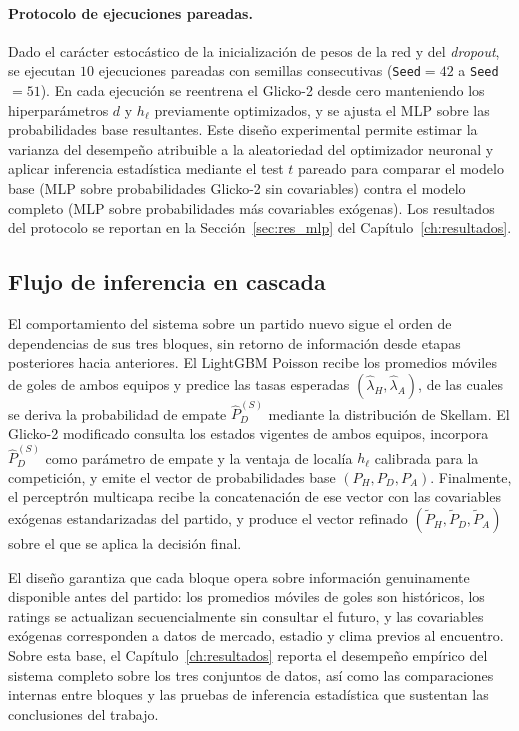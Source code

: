 \paragraph{Protocolo de ejecuciones pareadas.} Dado el car\'acter estoc\'astico de la inicializaci\'on de pesos de la red y del \emph{dropout}, se ejecutan $10$ ejecuciones pareadas con semillas consecutivas (\texttt{Seed}$=42$ a \texttt{Seed}$=51$). En cada ejecuci\'on se reentrena el Glicko-2 desde cero manteniendo los hiperpar\'ametros $d$ y $h_\ell$ previamente optimizados, y se ajusta el MLP sobre las probabilidades base resultantes. Este dise\~no experimental permite estimar la varianza del desempe\~no atribuible a la aleatoriedad del optimizador neuronal y aplicar inferencia estad\'istica mediante el test $t$ pareado para comparar el modelo base (MLP sobre probabilidades Glicko-2 sin covariables) contra el modelo completo (MLP sobre probabilidades m\'as covariables ex\'ogenas). Los resultados del protocolo se reportan en la Secci\'on~\ref{sec:res_mlp} del Cap\'itulo~\ref{ch:resultados}.

\subsection{Flujo de inferencia en cascada}
\label{subsec:cascada}

El comportamiento del sistema sobre un partido nuevo sigue el orden de dependencias de sus tres bloques, sin retorno de informaci\'on desde etapas posteriores hacia anteriores. El LightGBM Poisson recibe los promedios m\'oviles de goles de ambos equipos y predice las tasas esperadas $(\hat{\lambda}_H, \hat{\lambda}_A)$, de las cuales se deriva la probabilidad de empate $\hat{P}_D^{(S)}$ mediante la distribuci\'on de Skellam. El Glicko-2 modificado consulta los estados vigentes de ambos equipos, incorpora $\hat{P}_D^{(S)}$ como par\'ametro de empate y la ventaja de local\'ia $h_\ell$ calibrada para la competici\'on, y emite el vector de probabilidades base $(P_H, P_D, P_A)$. Finalmente, el perceptr\'on multicapa recibe la concatenaci\'on de ese vector con las covariables ex\'ogenas estandarizadas del partido, y produce el vector refinado $(\tilde{P}_H, \tilde{P}_D, \tilde{P}_A)$ sobre el que se aplica la decisi\'on final.

El dise\~no garantiza que cada bloque opera sobre informaci\'on genuinamente disponible antes del partido: los promedios m\'oviles de goles son hist\'oricos, los ratings se actualizan secuencialmente sin consultar el futuro, y las covariables ex\'ogenas corresponden a datos de mercado, estadio y clima previos al encuentro. Sobre esta base, el Cap\'itulo~\ref{ch:resultados} reporta el desempe\~no emp\'irico del sistema completo sobre los tres conjuntos de datos, as\'i como las comparaciones internas entre bloques y las pruebas de inferencia estad\'istica que sustentan las conclusiones del trabajo.

